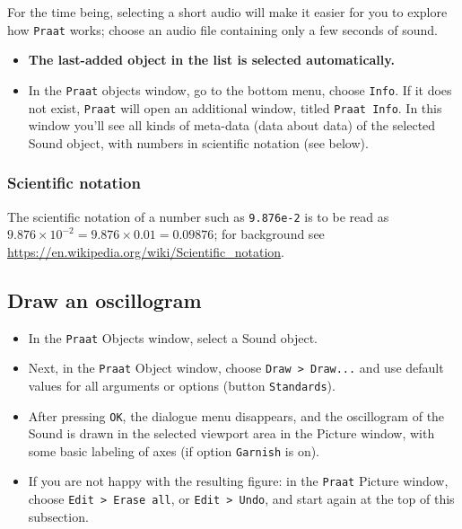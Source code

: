 \documentclass[
]{book}
\begin{document}
For the time being, selecting a short audio will make it easier for you to explore how \texttt{Praat} works; choose an audio file containing only a few seconds of sound.

\begin{itemize}
\item
  \textbf{The last-added object in the list is selected automatically.}
\item
  In the \texttt{Praat} objects window, go to the bottom menu, choose \texttt{Info}. If it does not exist, \texttt{Praat} will open an additional window, titled \texttt{Praat\ Info}. In this window you'll see all kinds of meta-data (data about data) of the selected Sound object, with numbers in scientific notation (see below).
\end{itemize}

\label{scientificnotation}
\subsubsection{Scientific notation}\label{sec:scientificnotation}

The scientific notation of a number such as \texttt{9.876e-2} is to be read as \(9.876 \times 10^{-2} = 9.876 \times 0.01 = 0.09876\); for background see \url{https://en.wikipedia.org/wiki/Scientific_notation}.

\label{box-draw}
\subsection{Draw an oscillogram}\label{draw-an-oscillogram}

\begin{itemize}
\item
  In the \texttt{Praat} Objects window, select a Sound object.
\item
  Next, in the \texttt{Praat} Object window, choose \texttt{Draw\ \textgreater{}\ Draw...} and use default values for all arguments or options (button \texttt{Standards}).
\item
  After pressing \texttt{OK}, the dialogue menu disappears, and the oscillogram of the Sound is drawn in the selected viewport area in the Picture window, with some basic labeling of axes (if option \texttt{Garnish} is on).
\item
  If you are not happy with the resulting figure: in the \texttt{Praat} Picture window, choose \texttt{Edit\ \textgreater{}\ Erase\ all}, or \texttt{Edit\ \textgreater{}\ Undo}, and start again at the top of this subsection.
\end{itemize}
\end{document}
